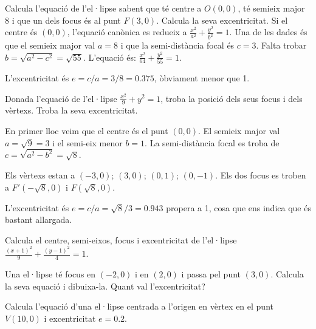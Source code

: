 \begin{resolt}[E]{Calcula l'equació de l'el·lipse sabent que té centre a $O(0,0)$, té semieix major 8 i que un dels focus és al punt $F(3,0)$. Calcula la seva excentricitat. }
	Si el centre és $(0,0)$, l'equació canònica es redueix a $\frac{x^2}{a^2}+\frac{y^2}{b^2}=1$. Una de les dades és que el semieix major val $a=8$ i que la semi-distància focal és $c=3$. Falta trobar $b=\sqrt{a^2-c^2}=\sqrt{55}$. L'equació és: $\frac{x^2}{64}+\frac{y^2}{55}=1$.
	
	L'excentricitat és $e=c/a = 3/8 = 0.375 $, òbviament menor que 1.
	
\end{resolt}
\begin{resolt}{Donada l'equació de l'el·lipse  $\frac{x^2}{9}+y^2=1$, troba la posició dels seus focus i dels vèrtexs. Troba la seva excentricitat. }
 
	
	En primer lloc veim que el centre és el punt $(0,0)$. El semieix major val $a=\sqrt{9}=3$ i el semi-eix menor $b=1$. La semi-distància focal es troba de $c=\sqrt{a^2-b^2}=\sqrt{8}$. 
	\vspace{0.25cm}
	
	Els vèrtexs estan a $(-3,0)$; $(3,0)$; $(0,1)$; $(0,-1)$. Els dos focus es troben a $F'(-\sqrt{8},0)$ i $F(\sqrt{8},0)$.  
	\vspace{0.25cm}
	
	L'excentricitat és $e=c/a = \sqrt{8}/3 = 0.943$ propera a 1, cosa que ens indica que és bastant allargada.
	
\end{resolt}

\begin{mylist}
	
	\exer[1] Calcula el centre, semi-eixos, focus i excentricitat de l'el·lipse \linebreak  $\frac{\left(x+1\right)^{2} }{9} +\frac{\left(y-1\right)^{2} }{4} =1$.
	
	\exer[1] Una el·lipse té focus en $(-2, 0)$ i en $(2, 0)$ i passa pel punt $(3, 0)$. Calcula la seva equació i dibuixa-la. Quant val l'excentricitat?
	
	\exer[1] Calcula l'equació d'una el·lipse centrada a l'origen en vèrtex en el punt $V(10,0)$ i excentricitat $e=0.2$.
	
\end{mylist}

